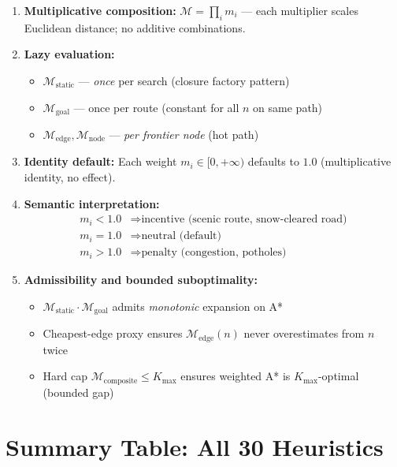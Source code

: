 \documentclass[12pt,a4paper]{article}
\newcommand{\M}{\mathcal{M}}
\newcommand{\Kmax}{K_{\max}}
\begin{document}
\begin{enumerate}
  \item \textbf{Multiplicative composition:} $\M = \prod_i m_i$ — each multiplier scales Euclidean distance; no additive combinations.

  \item \textbf{Lazy evaluation:}
  \begin{itemize}
    \item $\M_{\text{static}}$ — \textit{once} per search (closure factory pattern)
    \item $\M_{\text{goal}}$ — once per route (constant for all $n$ on same path)
    \item $\M_{\text{edge}}, \M_{\text{node}}$ — \textit{per frontier node} (hot path)
  \end{itemize}

  \item \textbf{Identity default:} Each weight $m_i \in [0, +\infty)$ defaults to $1.0$ (multiplicative identity, no effect).

  \item \textbf{Semantic interpretation:}
  \begin{align*}
    m_i < 1.0 &\Rightarrow \text{incentive (scenic route, snow-cleared road)} \\
    m_i = 1.0 &\Rightarrow \text{neutral (default)} \\
    m_i > 1.0 &\Rightarrow \text{penalty (congestion, potholes)}
  \end{align*}

  \item \textbf{Admissibility and bounded suboptimality:}
  \begin{itemize}
    \item $\M_{\text{static}} \cdot \M_{\text{goal}}$ admits \textit{monotonic} expansion on A*
    \item Cheapest-edge proxy ensures $\M_{\text{edge}}(n)$ never overestimates from $n$ twice
    \item Hard cap $\M_{\text{composite}} \leq \Kmax$ ensures weighted A* is $\Kmax$-optimal (bounded gap)
  \end{itemize}
\end{enumerate}

\section*{Summary Table: All 30 Heuristics}
\end{document}
